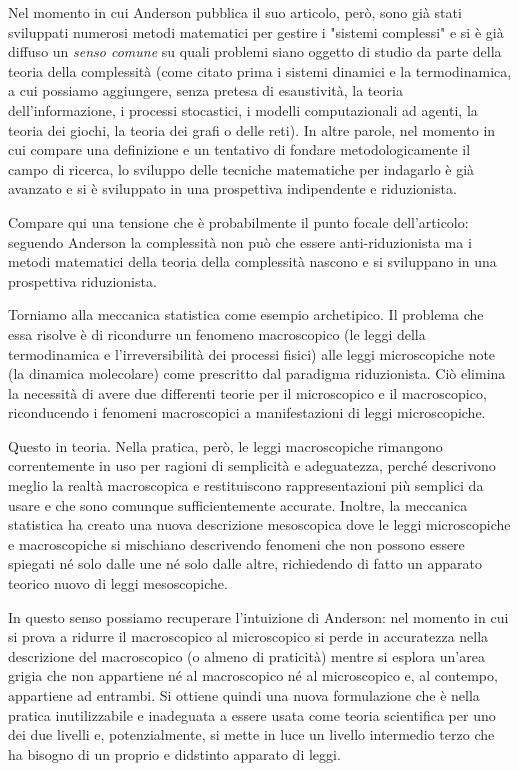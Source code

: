 \documentclass[a4paper, headings=standardclasses]{scrartcl}
\begin{document}
Nel momento in cui Anderson pubblica il suo articolo, però, sono già stati sviluppati numerosi metodi matematici per gestire i "sistemi complessi" e si è già diffuso un \textit{senso comune} su quali problemi siano oggetto di studio da parte della teoria della complessità (come citato prima i sistemi dinamici e la termodinamica, a cui possiamo aggiungere, senza pretesa di esaustività, la teoria dell'informazione, i processi stocastici, i modelli computazionali ad agenti, la teoria dei giochi, la teoria dei grafi o delle reti).
In altre parole, nel momento in cui compare una definizione e un tentativo di fondare metodologicamente il campo di ricerca, lo sviluppo delle tecniche matematiche per indagarlo è già avanzato e si è sviluppato in una prospettiva indipendente e riduzionista.

Compare qui una tensione che è probabilmente il punto focale dell'articolo: seguendo Anderson la complessità non può che essere anti-riduzionista ma i metodi matematici della teoria della complessità nascono e si sviluppano in una prospettiva riduzionista.

Torniamo alla meccanica statistica come esempio archetipico. Il problema che essa risolve è di ricondurre un fenomeno macroscopico (le leggi della termodinamica e l'irreversibilità dei processi fisici) alle leggi microscopiche note (la dinamica molecolare) come prescritto dal paradigma riduzionista.  Ciò elimina la necessità di avere due differenti teorie per il microscopico e il macroscopico, riconducendo i fenomeni macroscopici a manifestazioni di leggi microscopiche.

Questo in teoria. Nella pratica, però, le leggi macroscopiche rimangono correntemente in uso per ragioni di semplicità e adeguatezza, perché descrivono meglio la realtà macroscopica e restituiscono rappresentazioni più semplici da usare e che sono comunque sufficientemente accurate.
Inoltre, la meccanica statistica ha creato una nuova descrizione mesoscopica dove le leggi microscopiche e macroscopiche si mischiano descrivendo fenomeni che non possono essere spiegati né solo dalle une né solo dalle altre, richiedendo di fatto un apparato teorico nuovo di leggi mesoscopiche.

In questo senso possiamo recuperare l'intuizione di Anderson: nel momento in cui si prova a ridurre il macroscopico al microscopico si perde in accuratezza nella descrizione del macroscopico (o almeno di praticità) mentre si esplora un'area grigia che non appartiene né al macroscopico né al microscopico e, al contempo, appartiene ad entrambi.
Si ottiene quindi una nuova formulazione che è nella pratica inutilizzabile e inadeguata a essere usata come teoria scientifica per uno dei due livelli e, potenzialmente, si mette in luce un livello intermedio terzo che ha bisogno di un proprio e didstinto apparato di leggi.
\end{document}
